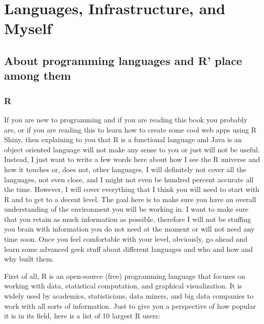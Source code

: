 \documentclass[]{book}
\begin{document}
\hypertarget{languages-infrastructure-and-myself}{%
\chapter{Languages, Infrastructure, and Myself}\label{languages-infrastructure-and-myself}}

\hypertarget{about-programming-languages-and-r-place-among-them}{%
\section{About programming languages and R' place among them}\label{about-programming-languages-and-r-place-among-them}}

\hypertarget{r}{%
\subsection{R}\label{r}}

If you are new to programming and if you are reading this book you probably are, or if you are reading this to learn how to create some cool web apps using R Shiny, then explaining to you that R is a functional language and Java is an object oriented language will not make any sense to you or just will not be useful. Instead, I just want to write a few words here about how I see the R universe and how it touches or, does not, other languages. I will definitely not cover all the languages, not even close, and I might not even be hundred percent accurate all the time. However, I will cover everything that I think you will need to start with R and to get to a decent level. The goal here is to make sure you have an overall understanding of the environment you will be working in. I want to make sure that you retain as much information as possible, therefore I will not be stuffing you brain with information you do not need at the moment or will not need any time soon. Once you feel comfortable with your level, obviously, go ahead and learn some advanced geek stuff about different languages and who and how and why built them.

First of all, R is an open-source (free) programming language that focuses on working with data, statistical computation, and graphical visualization. It is widely used by academics, statisticians, data miners, and big data companies to work with all sorts of information. Just to give you a perspective of how popular it is in its field, here is a list of 10 largest R users:
\end{document}

